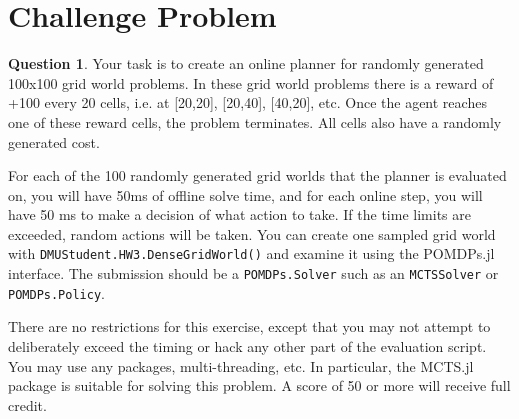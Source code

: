 \documentclass{article}
\theoremstyle{definition}
\newtheorem{question}[thm]{Question}
\begin{document}
% 
%     
% 
%     

\section{Challenge Problem}

\begin{question}
    Your task is to create an online planner for randomly generated 100x100 grid world problems. In these grid world problems there is a reward of +100 every 20 cells, i.e. at [20,20], [20,40], [40,20], etc. Once the agent reaches one of these reward cells, the problem terminates. All cells also have a randomly generated cost.

    For each of the 100 randomly generated grid worlds that the planner is evaluated on, you will have 50ms of offline solve time, and for each online step, you will have 50 ms to make a decision of what action to take. If the time limits are exceeded, random actions will be taken. You can create one sampled grid world with \texttt{DMUStudent.HW3.DenseGridWorld()} and examine it using the POMDPs.jl interface. The submission should be a \texttt{POMDPs.Solver} such as an \texttt{MCTSSolver} or \texttt{POMDPs.Policy}.

    There are no restrictions for this exercise, except that you may not attempt to deliberately exceed the timing or hack any other part of the evaluation script. You may use any packages, multi-threading, etc. In particular, the MCTS.jl package is suitable for solving this problem. A score of 50 or more will receive full credit.
\end{question}
\end{document}
